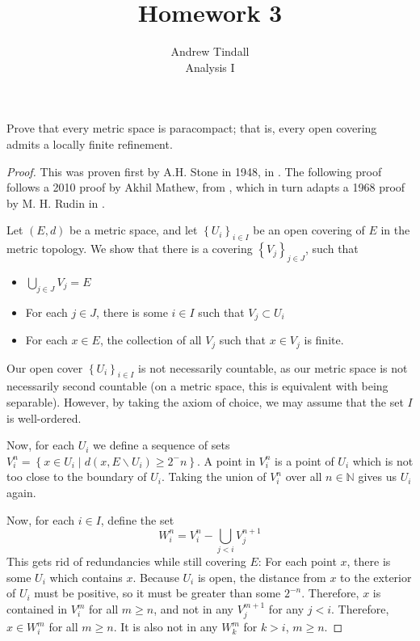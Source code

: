 \documentclass[12pt]{article}
\newcommand{\N}{\mathbb{N}}
\newcommand{\bs}{\backslash}
\theoremstyle{definition}
\newenvironment{problem}[2][Problem]{\begin{trivlist}
\item[\hskip \labelsep {\bfseries #1}\hskip \labelsep {\bfseries #2.}]}{\end{trivlist}}
\begin{document}
 
 
\title{Homework 3}
\author{Andrew Tindall\\
Analysis I}
 
\maketitle
\begin{problem}{1}
	Prove that every metric space is paracompact; that is, every open covering admits a locally finite refinement.
\end{problem}
\begin{proof}
	This was proven first by A.H. Stone in 1948, in \cite{stone}. The following proof follows a 2010 proof by Akhil Mathew, from \cite{mathew}, which in turn adapts a 1968 proof by M. H. Rudin in \cite{rudin}.
	\par Let $(E, d)$ be a metric space, and let $\left\{ U_i \right\}_{i \in I}$ be an open covering of $E$ in the metric topology. We show that there is a covering $\left\{ V_j \right\}_{j \in J}$, such that 
	\begin{itemize}
		\item $\bigcup_{j \in J} V_j = E$
		\item For each $j \in J$, there is some $i \in I$ such that $V_j \subset U_i$
		\item For each $x \in E$, the collection of all $V_j$ such that $x \in V_j$ is finite.
	\end{itemize}
	Our open cover $\left\{ U_i \right\}_{i\in I}$ is not necessarily countable, as our metric space is not necessarily second countable (on a metric space, this is equivalent with being separable). However, by taking the axiom of choice, we may assume that the set $I$ is well-ordered. 
	\par Now, for each $U_i$ we define a sequence of sets $V_i^n = \left\{ x \in U_i\mid d(x, E \bs U_i) \geq 2^-n \right\}$. A point in $V_i^n$ is a point of $U_i$ which is not too close to the boundary of $U_i$. Taking the union of $V_i^n$ over all $n \in \N$ gives us $U_i$ again. 
	\par Now, for each $i \in I$, define the set
	\[ W_i^n = V_i^n - \bigcup_{j < i}V_j^{n+1}\]
	This gets rid of redundancies while still covering $E$: For each point $x$, there is some $U_i$ which contains $x$. Because $U_i$ is open, the distance from $x$ to the exterior of $U_i$ must be positive, so it must be greater than some $2^{-n}$. Therefore, $x$ is contained in $V_i^m$ for all $m \geq n$, and not in any $V_j^{m+1}$ for any $j < i$. Therefore, $x \in W_i^m$ for all $m \geq n$. It is also not in any $W_k^m$ for $k > i$, $m \geq n$. 

\end{proof}
\end{document}
